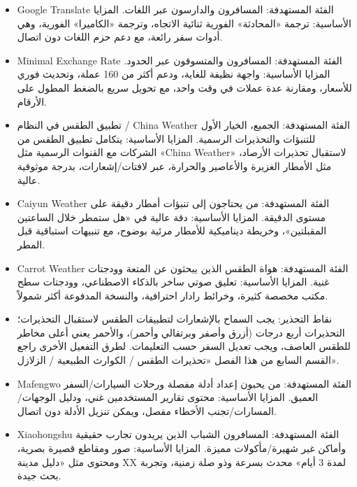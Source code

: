 
\begin{itemize}
  \item Google Translate الفئة المستهدفة: المسافرون والدارسون عبر اللغات. المزايا الأساسية: ترجمة «المحادثة» الفورية ثنائية الاتجاه، وترجمة «الكاميرا» الفورية، وهي أدوات سفر رائعة، مع دعم حزم اللغات دون اتصال.
\end{itemize}


\begin{itemize}
  \item Minimal Exchange Rate الفئة المستهدفة: المسافرون والمتسوقون عبر الحدود. المزايا الأساسية: واجهة نظيفة للغاية، ودعم أكثر من 160 عملة، وتحديث فوري للأسعار، ومقارنة عدة عملات في وقت واحد، مع تحويل سريع بالضغط المطول على الأرقام.
\end{itemize}


\begin{itemize}
  \item تطبيق الطقس في النظام / China Weather الفئة المستهدفة: الجميع، الخيار الأول للتنبؤات والتحذيرات الرسمية. المزايا الأساسية: يتكامل تطبيق الطقس من الشركات مع القنوات الرسمية مثل «China Weather» لاستقبال تحذيرات الأرصاد، مثل الأمطار الغزيرة والأعاصير والحرارة، عبر لافتات/إشعارات، بدرجة موثوقية عالية.
  \item Caiyun Weather الفئة المستهدفة: من يحتاجون إلى تنبؤات أمطار دقيقة على مستوى الدقيقة. المزايا الأساسية: دقة عالية في «هل ستمطر خلال الساعتين المقبلتين»، وخريطة ديناميكية للأمطار مرئية بوضوح، مع تنبيهات استباقية قبل المطر.
  \item Carrot Weather الفئة المستهدفة: هواة الطقس الذين يبحثون عن المتعة وودجتات غنية. المزايا الأساسية: تعليق صوتي ساخر بالذكاء الاصطناعي، وودجتات سطح مكتب مخصصة كثيرة، وخرائط رادار احترافية، والنسخة المدفوعة أكثر شمولاً.
  \item نقاط التحذير: يجب السماح بالإشعارات لتطبيقات الطقس لاستقبال التحذيرات؛ التحذيرات أربع درجات (أزرق وأصفر وبرتقالي وأحمر)، والأحمر يعني أعلى مخاطر للطقس العاصف، ويجب تعديل السفر حسب التعليمات. لطرق التفعيل الأخرى راجع القسم السابع من هذا الفصل «تحذيرات الطقس / الكوارث الطبيعية / الزلازل».
\end{itemize}


\begin{itemize}
  \item Mafengwo الفئة المستهدفة: من يحبون إعداد أدلة مفصلة ورحلات السيارات/السفر العميق. المزايا الأساسية: محتوى تقارير المستخدمين غني، ودليل الوجهات/المسارات/تجنب الأخطاء مفصل، ويمكن تنزيل الأدلة دون اتصال.
  \item Xiaohongshu الفئة المستهدفة: المسافرون الشباب الذين يريدون تجارب حقيقية وأماكن غير شهيرة/مأكولات مميزة. المزايا الأساسية: صور ومقاطع قصيرة بصرية، ومحتوى مثل «دليل مدينة XX لمدة 3 أيام» محدث بسرعة وذو صلة زمنية، وتجربة بحث جيدة.
\end{itemize}

